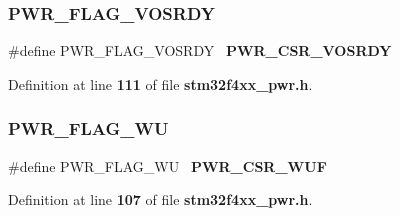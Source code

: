 \subsubsection{P\+W\+R\+\_\+\+F\+L\+A\+G\+\_\+\+V\+O\+S\+R\+DY}
{\footnotesize\ttfamily \#define P\+W\+R\+\_\+\+F\+L\+A\+G\+\_\+\+V\+O\+S\+R\+DY~\textbf{ P\+W\+R\+\_\+\+C\+S\+R\+\_\+\+V\+O\+S\+R\+DY}}



Definition at line \textbf{ 111} of file \textbf{ stm32f4xx\+\_\+pwr.\+h}.

\mbox{\label{group__PWR__Flag_ga2d06760a5769e729b06d41e37036d58e}} 
\subsubsection{P\+W\+R\+\_\+\+F\+L\+A\+G\+\_\+\+WU}
{\footnotesize\ttfamily \#define P\+W\+R\+\_\+\+F\+L\+A\+G\+\_\+\+WU~\textbf{ P\+W\+R\+\_\+\+C\+S\+R\+\_\+\+W\+UF}}



Definition at line \textbf{ 107} of file \textbf{ stm32f4xx\+\_\+pwr.\+h}.

